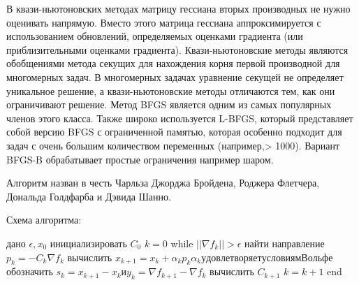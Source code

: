 \documentclass[12pt]{article} %
\begin{document}
В квази-ньютоновских методах матрицу гессиана вторых производных не нужно оценивать напрямую. Вместо этого матрица гессиана аппроксимируется с использованием обновлений, определяемых оценками градиента (или приблизительными оценками градиента). Квази-ньютоновские методы являются обобщениями метода секущих для нахождения корня первой производной для многомерных задач. В многомерных задачах уравнение секущей не определяет уникальное решение, а квази-ньютоновские методы отличаются тем, как они ограничивают решение. Метод BFGS является одним из самых популярных членов этого класса\cite{5}. Также широко используется L-BFGS, который представляет собой версию BFGS с ограниченной памятью, которая особенно подходит для задач с очень большим количеством переменных (например,> 1000). Вариант BFGS-B обрабатывает простые ограничения например шаром.

Алгоритм назван в честь Чарльза Джорджа Бройдена, Роджера Флетчера, Дональда Голдфарба и Дэвида Шанно.

Схема алгоритма:
\begin{flushleft}
	дано $ \epsilon , x_{0} $ \newline
	инициализировать $C_{0}$ \newline
	$ k=0$ \newline
	while $||\nabla f_{k}||>\epsilon$ \newline
	найти направление $p_{k}=-C_{k}\nabla f_{k}$ \newline
	вычислить $x_{k+1}=x_{k}+\alpha _{k}p_{k} \alpha _{k} удовлетворяет условиям Вольфе $ \newline
	обозначить $s_{k}=x_{k+1}-x_{k} и y_{k}=\nabla f_{k+1}-\nabla f_{k} $ \newline
	вычислить $C_{k+1}$ \newline
	$ k=k+1$ \newline
	end \newline
\end{flushleft}




\newpage
\end{document}
